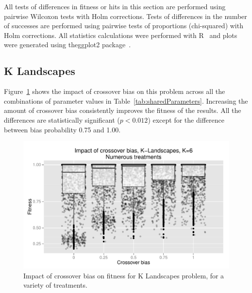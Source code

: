 \documentclass{sig-alternate}
\begin{document}
All tests of differences in fitness or hits in this section are performed using 
pairwise Wilcoxon tests with Holm corrections. Tests of differences in the number of successes are
performed using pairwise tests of proportions (chi-squared) with Holm corrections.
All statistics calculations were performed with R~\cite{R} 
and plots were generated using the\linebreak ggplot2 package~\cite{ggplot2Book}.

\subsection{K Landscapes}

Figure~\ref{fig:KLandscapes6_results} shows the impact of crossover bias on this problem across all the combinations of
parameter values in Table~\ref{tab:sharedParameters}. Increasing the amount of crossover bias consistently improves the fitness of the results. All the
differences are statistically significant ($p < 0.012$) except for the difference between bias probability 0.75 and
1.00.

%
%
%
%

\begin{figure}
\centering
\includegraphics[width=0.45 \textwidth]{Plots/KLandscapes6_XO_bias_impact_transformed_boxplot_alpha075.pdf}
\caption{Impact of crossover bias on fitness for K Landscapes problem, for a variety of treatments.}
\label{fig:KLandscapes6_results}
\end{figure}
\end{document}
